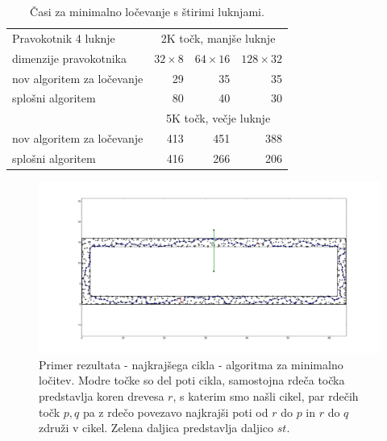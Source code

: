 \documentclass[a4paper, 12pt]{book}
\begin{document}
\begin{table}[h!]
\begin{center}
\begin{tabular}{l*{3}{r}}
Pravokotnik 4 luknje & \multicolumn{3}{c}{2K točk, manjše luknje} \\
dimenzije pravokotnika	&	$32\times 8$ &	$64\times 16$ & $128\times 32$ \\	
\hline
nov algoritem za ločevanje	&	29	&	35	&	35	\\
splošni algoritem			&	80	&	40	&	30	\\
\hline
& \multicolumn{3}{c}{5K točk, večje luknje} \\
\hline
nov algoritem za ločevanje &	413 & 451 & 388  \\
splošni algoritem &	416 & 266 & 206
\end{tabular}
\caption{Časi za minimalno ločevanje s štirimi luknjami.}
\label{table7}
\end{center}
\end{table}

\begin{figure}
\centerline{\includegraphics[scale=0.3]{pics/separation-64-1-1000-narrow-2.png}}
\caption{Primer rezultata - najkrajšega cikla - algoritma za minimalno ločitev. Modre točke so del poti cikla, samostojna rdeča točka predstavlja koren drevesa $r$, s katerim smo našli cikel, par rdečih točk $p,q$ pa z rdečo povezavo najkrajši poti od $r$ do $p$ in $r$ do $q$ združi v cikel. Zelena daljica predstavlja daljico $st$.}
\label{sep-64-1-1000-narrow}
\end{figure}
\end{document}
